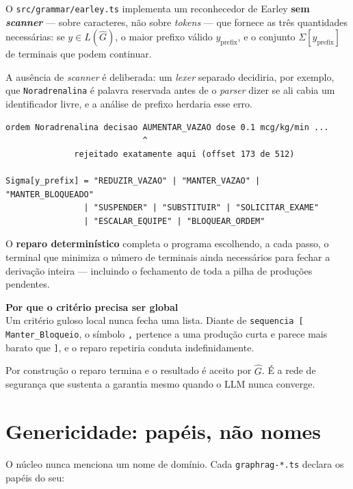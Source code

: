 \documentclass[11pt,a4paper]{article}
\newcommand{\aviso}[2]{%
  \begin{center}
  \begin{minipage}{0.95\linewidth}
  \setlength{\fboxsep}{8pt}%
  \colorbox{corAlertaFundo}{%
    \begin{minipage}{\dimexpr\linewidth-16pt\relax}
    \textbf{\textcolor{corAlerta}{#1}}\\[2pt]#2
    \end{minipage}}
  \end{minipage}
  \end{center}
}
\newcommand{\arq}[1]{\texttt{\small #1}}
\begin{document}
O \arq{src/grammar/earley.ts} implementa um reconhecedor de Earley
\textbf{sem \emph{scanner}} --- sobre caracteres, não sobre \emph{tokens} --- que
fornece as três quantidades necessárias: se $y \in L(\hat{G})$, o maior prefixo
válido $y_{\text{prefix}}$, e o conjunto $\Sigma[y_{\text{prefix}}]$ de terminais
que podem continuar.

A ausência de \emph{scanner} é deliberada: um \emph{lexer} separado decidiria,
por exemplo, que \texttt{Noradrenalina} é palavra reservada antes de o
\emph{parser} dizer se ali cabia um identificador livre, e a análise de prefixo
herdaria esse erro.

\begin{lstlisting}
ordem Noradrenalina decisao AUMENTAR_VAZAO dose 0.1 mcg/kg/min ...
                            ^
              rejeitado exatamente aqui (offset 173 de 512)

Sigma[y_prefix] = "REDUZIR_VAZAO" | "MANTER_VAZAO" | "MANTER_BLOQUEADO"
                | "SUSPENDER" | "SUBSTITUIR" | "SOLICITAR_EXAME"
                | "ESCALAR_EQUIPE" | "BLOQUEAR_ORDEM"
\end{lstlisting}

O \textbf{reparo determinístico} completa o programa escolhendo, a cada passo, o
terminal que minimiza o número de terminais ainda necessários para fechar a
derivação inteira --- incluindo o fechamento de toda a pilha de produções
pendentes.

\aviso{Por que o critério precisa ser global}{%
Um critério guloso local nunca fecha uma lista. Diante de
\texttt{sequencia [ Manter\_Bloqueio}, o símbolo \texttt{,} pertence a uma
produção curta e parece mais barato que \texttt{]}, e o reparo repetiria conduta
indefinidamente.}

Por construção o reparo termina e o resultado é aceito por $\hat{G}$. É a rede
de segurança que sustenta a garantia mesmo quando o LLM nunca converge.

\section{Genericidade: papéis, não nomes}
\label{sec:genericidade}

O núcleo nunca menciona um nome de domínio. Cada \arq{graphrag-*.ts} declara os
papéis do seu:
\end{document}
